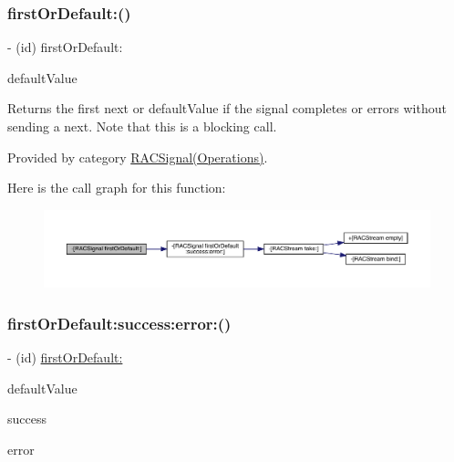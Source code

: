 \subsubsection{\texorpdfstring{first\+Or\+Default\+:()}{firstOrDefault:()}\hspace{0.1cm}{\footnotesize\ttfamily [3/3]}}
{\footnotesize\ttfamily -\/ (id) first\+Or\+Default\+: \begin{DoxyParamCaption}\item[{(id)}]{default\+Value }\end{DoxyParamCaption}}

Returns the first {\ttfamily next} or {\ttfamily default\+Value} if the signal completes or errors without sending a {\ttfamily next}. Note that this is a blocking call. 

Provided by category \mbox{\hyperlink{category_r_a_c_signal_07_operations_08_a51f980781f2dc9e662278d7db7b0cd38}{R\+A\+C\+Signal(\+Operations)}}.

Here is the call graph for this function\+:\nopagebreak
\begin{figure}[H]
\begin{center}
\leavevmode
\includegraphics[width=350pt]{interface_r_a_c_signal_a51f980781f2dc9e662278d7db7b0cd38_cgraph}
\end{center}
\end{figure}
\mbox{\label{interface_r_a_c_signal_a12b765a16842e9c7aa1d13b00d8df09b}} 
\subsubsection{\texorpdfstring{first\+Or\+Default\+:success\+:error\+:()}{firstOrDefault:success:error:()}\hspace{0.1cm}{\footnotesize\ttfamily [1/3]}}
{\footnotesize\ttfamily -\/ (id) \mbox{\hyperlink{category_r_a_c_signal_07_operations_08_a51f980781f2dc9e662278d7db7b0cd38}{first\+Or\+Default\+:}} \begin{DoxyParamCaption}\item[{(id)}]{default\+Value }\item[{success:(B\+O\+OL $\ast$)}]{success }\item[{error:(N\+S\+Error $\ast$$\ast$)}]{error }\end{DoxyParamCaption}}

